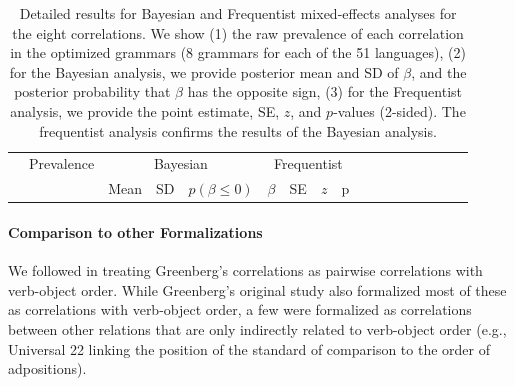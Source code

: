 \documentclass[10pt,twoside,lineno]{article}
\begin{document}
\begin{table}
\small{
\begin{center}
\begin{tabular}{|l||l|lll|llll|ll|llllll}
\hline
 & Prevalence & \multicolumn{3}{c|}{Bayesian} & \multicolumn{4}{c|}{Frequentist} \\ 
& & Mean & SD & $p(\beta \leq 0)$ & $\beta$ & SE & $z$ & p \\
\hline\hline
	
\hline
\end{tabular}
\end{center}
}
	\caption{Detailed results for Bayesian and Frequentist mixed-effects analyses for the eight correlations. 
We show (1) the raw prevalence of each correlation in the optimized grammars (8 grammars for each of the 51 languages),
(2) for the Bayesian analysis, we provide posterior mean and SD of $\beta$, and the posterior probability that $\beta$ has the opposite sign,
(3) for the Frequentist analysis, we provide the point estimate, SE, $z$, and $p$-values (2-sided).
The frequentist analysis confirms the results of the Bayesian analysis.
}\label{tab:corr-regression}
\end{table}




\paragraph{Comparison to other Formalizations}

We followed \citet{dryer1992greenbergian} in treating Greenberg's correlations as pairwise correlations with verb-object order.
While Greenberg's original study \cite{greenberg1963universals} also formalized most of these as correlations with verb-object order, a few were formalized as correlations between other relations that are only indirectly related to verb-object order (e.g., Universal 22 linking the position of the standard of comparison to the order of adpositions).
\end{document}
